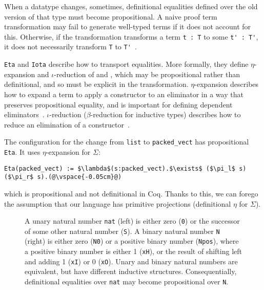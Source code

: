 When a datatype changes, sometimes, definitional equalities defined over the old version of that type must become propositional.
A naive proof term transformation may fail to generate well-typed terms if it does not account for this.
Otherwise, if the transformation transforms a term \lstinline{t : T} to some \lstinline{t' : T'}, it does not necessarily
transform \lstinline{T} to \lstinline{T'}~\cite{tabareau2019marriage}.

\lstinline{Eta} and \lstinline{Iota} describe how to transport equalities.
More formally, they define $\eta$-expansion and $\iota$-reduction of \Aa and \B,
which may be propositional rather than definitional,
and so must be explicit in the transformation.
$\eta$-expansion describes how to expand a term to apply a constructor to an eliminator in a way that preserves propositional equality,
and is important for defining dependent eliminators~\cite{nlab:eta-conversion}.
$\iota$-reduction ($\beta$-reduction for inductive types) describes how to reduce an elimination of a constructor~\cite{nlab:beta-reduction}.

The configuration for the change from \lstinline{list} to \lstinline{packed_vect} has propositional \lstinline{Eta}.
It uses $\eta$-expansion for $\Sigma$:

\begin{lstlisting}
Eta(packed_vect) := $\lambda$(s:packed_vect).$\exists$ ($\pi_l$ s) ($\pi_r$ s).(@\vspace{-0.05cm}@)
\end{lstlisting}
which is propositional and not definitional in Coq.
Thanks to this, we can forego the assumption that our language has primitive projections (definitional $\eta$ for $\Sigma$).

\begin{figure}
\begin{minipage}{0.44\columnwidth}
   
\end{minipage}
\hfill
\begin{minipage}{0.54\columnwidth}
   
\end{minipage}
\vspace{-0.2cm}
\caption{A unary natural number \lstinline{nat} (left) is either zero (\lstinline{0}) or the successor of some other natural number (\lstinline{S}).
A binary natural number \lstinline{N} (right) is either zero (\lstinline{N0}) or a positive binary number (\lstinline{Npos}), where a positive binary number is either 1 (\lstinline{xH}), or the result of shifting left and adding 1 (\lstinline{xI}) or
0 (\lstinline{xO}). Unary and binary natural numbers are equivalent, but have different inductive structures.
Consequentially, definitional equalities over \lstinline{nat} may become propositional over \lstinline{N}.}
\vspace{-0.2cm}
\label{fig:nattobin}
\end{figure}

